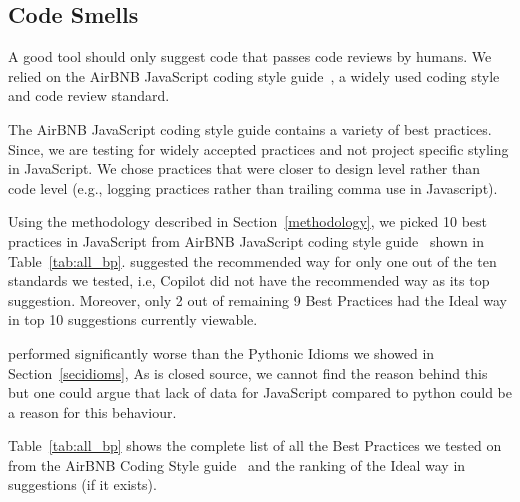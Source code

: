 \subsection{Code Smells}
\label{bp}
A good \AISE{} tool should only suggest code that passes code reviews by humans. We relied on the AirBNB JavaScript coding style guide~\cite{airbnb_code}, a widely used coding style and code review standard. 

The AirBNB JavaScript coding style guide contains a variety of best practices. 
Since, we are testing \cop{} for widely accepted practices and not project specific styling in JavaScript. We chose practices that were closer to design level rather than code level (e.g., logging practices rather than trailing comma use in Javascript).

Using the methodology described in Section~\ref{methodology}, we picked 10 best practices in JavaScript from AirBNB JavaScript coding style guide~\cite{airbnb_code} shown in Table~\ref{tab:all_bp}. \cop{} suggested the recommended way for only one out of the ten standards we tested, i.e, Copilot did not have the recommended way as its top suggestion. Moreover, only 2 out of remaining 9 Best Practices had the Ideal way in \cop{} top 10 suggestions currently viewable. 

\cop{} performed significantly worse than the Pythonic Idioms we showed in Section~\ref{secidioms}, As \cop{} is closed source, we cannot find the reason behind this but one could argue that lack of data for JavaScript compared to python could be a reason for this behaviour. 

Table~\ref{tab:all_bp} shows the complete list of all the Best Practices we tested on \cop{} from the AirBNB Coding Style guide~\cite{airbnb_code} and the ranking of the Ideal way in \cop{} suggestions (if it exists).

